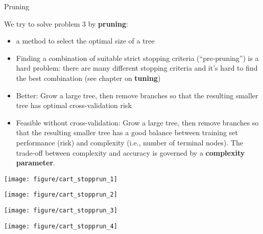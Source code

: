 \documentclass[11pt,compress,t,notes=noshow, xcolor=table]{beamer}
\newenvironment{knitrout}{}{} %
\begin{document}
\begin{vbframe}{Pruning}

We try to solve problem 3 by \textbf{pruning}:

\begin{itemize}
\item a method to select the optimal size of a tree
\item Finding a combination of suitable strict stopping criteria (\enquote{pre-pruning}) is a hard problem: there are many different stopping criteria and it's hard to find the best combination (see chapter on \textbf{tuning})
\item Better: Grow a large tree, then remove branches so that the resulting smaller tree has optimal cross-validation risk
\item Feasible without cross-validation: Grow a large tree, then remove branches so that the resulting smaller tree has a good balance between training set performance (risk) and complexity (i.e., number of terminal nodes). The trade-off between complexity and accuracy is governed by a \textbf{complexity parameter}.
\end{itemize}

\framebreak



\framebreak

\begin{knitrout}\scriptsize
{}\color{fgcolor}

{\centering \texttt{[image: figure/cart\_stopprun\_1]} 

}




{\centering \texttt{[image: figure/cart\_stopprun\_2]} 

}




{\centering \texttt{[image: figure/cart\_stopprun\_3]} 

}




{\centering \texttt{[image: figure/cart\_stopprun\_4]} 

}



\end{knitrout}
\end{vbframe}



\endlecture
\end{document}
